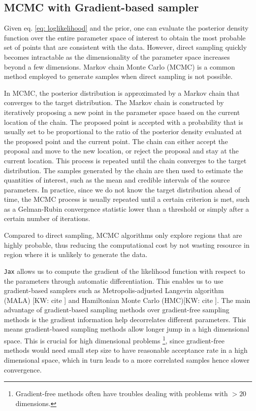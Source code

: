 \documentclass[twocolumn]{aastex631}
\newcommand{\kw}[1]{{\color{rb4}[KW: #1 ]}}
\begin{document}
\subsection{MCMC with Gradient-based sampler}
\label{sec:gradient}

Given eq. \ref{eq: loglikelihood} and the prior, one can evaluate the posterior
density function over the entire parameter space of interest to obtain the most
probable set of points that are consistent with the data. However, direct
sampling quickly becomes intractable as the dimensionality of the parameter
space increases beyond a few dimensions. Markov chain Monte Carlo (MCMC) is a
common method employed to generate samples when direct sampling is not possible.

In MCMC, the posterior distribution is approximated by a Markov chain that
converges to the target distribution. The Markov chain is constructed by
iteratively proposing a new point in the parameter space based on the current
location of the chain. The proposed point is accepted with a probability that is
usually set to be proportional to the ratio of the posterior density evaluated
at the proposed point and the current point. The chain can either accept the
proposal and move to the new location, or reject the proposal and stay at the
current location. This process is repeated until the chain converges to the
target distribution. The samples generated by the chain are then used to
estimate the quantities of interest, such as the mean and credible intervals of
the source parameters. In practice, since we do not know the target distribution
ahead of time, the MCMC process is usually repeated until a certain criterion is
met, such as a Gelman-Rubin convergence statistic \cite{Gelman-rhat} lower than
a threshold or simply after a certain number of iterations.

Compared to direct sampling, MCMC algorithms only explore regions that are
highly probable, thus reducing the computational cost by not wasting resource in
region where it is unlikely to generate the data. 

\texttt{Jax} allows us to compute the gradient of the likelihood function with
respect to the parameters through automatic differentiation. This enables us to
use gradient-based samplers such as Metropolis-adjusted Langevin algorithm
(MALA) \kw{cite} and Hamiltonian Monte Carlo (HMC)\kw{cite}. The main advantage
of gradient-based sampling methods over gradient-free sampling methods is the
gradient information help decorrelates different parameters. This means
gradient-based sampling methods allow longer jump in a high dimensional space.
This is crucial for high dimensional problems \footnote{Gradient-free methods
often have troubles dealing with problems with $>20$ dimensions.}, since
gradient-free methods would need small step size to have reasonable acceptance
rate in a high dimensional space, which in turn leads to a more correlated
samples hence slower convergence.
\end{document}
